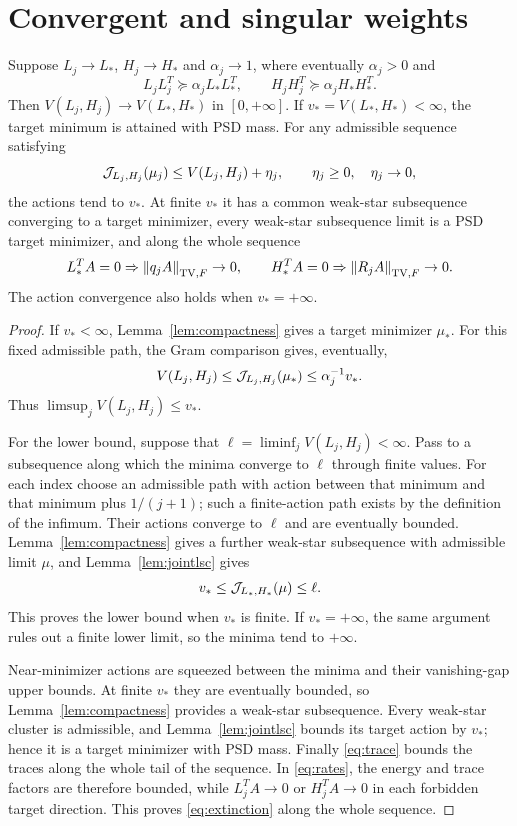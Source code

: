 \section{Convergent and singular weights}
\begin{theorem}\label{thm:finite}
Suppose $L_j\to L_*$, $H_j\to H_*$ and $\alpha_j\to1$, where eventually
$\alpha_j>0$ and
\begin{equation}\label{eq:relativej}
 L_jL_j^T\succeq\alpha_jL_*L_*^T,
 \qquad H_jH_j^T\succeq\alpha_jH_*H_*^T.
\end{equation}
Then $V(L_j,H_j)\to V(L_*,H_*)$ in $[0,+\infty]$.
If $v_*=V(L_*,H_*)<\infty$, the target minimum is attained with PSD mass.
For any admissible sequence satisfying
\[
 \mathcal J_{L_j,H_j}(\mu_j)\le V(L_j,H_j)+\eta_j,
 \qquad\eta_j\ge0,\quad\eta_j\to0,
\]
the actions tend to $v_*$. At finite $v_*$ it has a common weak-star
subsequence converging to a target minimizer, every weak-star subsequence
limit is a PSD target minimizer, and along the whole sequence
\begin{equation}\label{eq:extinction}
 L_*^TA=0\Rightarrow\left\lVert q_jA\right\rVert_{\operatorname{TV},F}\to0,
 \qquad H_*^TA=0\Rightarrow\left\lVert R_jA\right\rVert_{\operatorname{TV},F}\to0.
\end{equation}
The action convergence also holds when $v_*=+\infty$.
\end{theorem}
\begin{proof}
If $v_*<\infty$, Lemma~\ref{lem:compactness} gives a target minimizer
$\mu_*$. For this fixed admissible path, the Gram comparison gives,
eventually,
\[
 V(L_j,H_j)\le\mathcal J_{L_j,H_j}(\mu_*)
       \le\alpha_j^{-1}v_*.
\]
Thus $\limsup_jV(L_j,H_j)\le v_*$.

For the lower bound, suppose that
$\ell=\liminf_jV(L_j,H_j)<\infty$. Pass to a subsequence along which
the minima converge to $\ell$ through finite values. For each index choose
an admissible path with action between that minimum and that minimum plus
$1/(j+1)$; such a finite-action path exists by the definition of the infimum.
Their actions converge to $\ell$ and are eventually bounded. Lemma~\ref{lem:compactness} gives
a further weak-star subsequence with admissible limit $\mu$, and
Lemma~\ref{lem:jointlsc} gives
\[
 v_*\le\mathcal J_{L_*,H_*}(\mu)\le\ell.
\]
This proves the lower bound when $v_*$ is finite. If $v_*=+\infty$,
the same argument rules out a finite lower limit, so the minima tend to
$+\infty$.

Near-minimizer actions are squeezed between the minima and their
vanishing-gap upper bounds. At finite $v_*$ they are eventually bounded,
so Lemma~\ref{lem:compactness} provides a weak-star subsequence. Every
weak-star cluster is admissible, and Lemma~\ref{lem:jointlsc} bounds its
target action by $v_*$; hence it is a target minimizer with PSD mass.
Finally \eqref{eq:trace} bounds the traces along the whole tail of the
sequence. In \eqref{eq:rates}, the energy and trace factors are therefore
bounded, while $L_j^TA\to0$ or $H_j^TA\to0$ in each forbidden target
direction. This proves \eqref{eq:extinction} along the whole sequence.
\end{proof}

